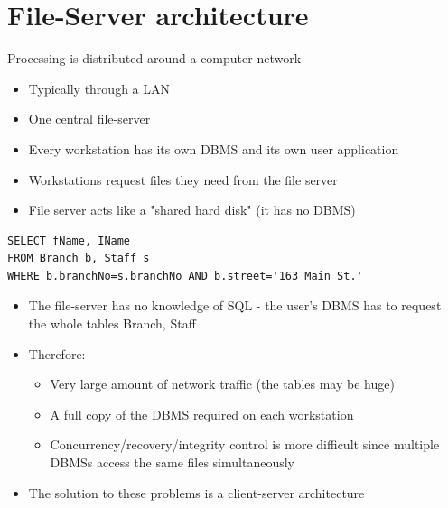 \documentclass{article}[18pt]
\begin{document}
\section{File-Server architecture}
Processing is distributed around a computer network
\begin{itemize}
	\item Typically through a LAN
	\item One central file-server
	\item Every workstation has its own DBMS and its own user application
	\item Workstations request files they need from the file server
	\item File server acts like a "shared hard disk" (it has no DBMS)
\end{itemize}
\begin{verbatim}
SELECT fName, IName
FROM Branch b, Staff s
WHERE b.branchNo=s.branchNo AND b.street='163 Main St.'
\end{verbatim}
\begin{itemize}
	\item The file-server has no knowledge of SQL - the user's DBMS has to request the whole tables Branch, Staff
	\item Therefore:
	\begin{itemize}
		\item Very large amount of network traffic (the tables may be huge)
		\item A full copy of the DBMS required on each workstation
		\item Concurrency/recovery/integrity control is more difficult since multiple DBMSs access the same files simultaneously
	\end{itemize}
	\item The solution to these problems is a client-server architecture
\end{itemize}
\end{document}
